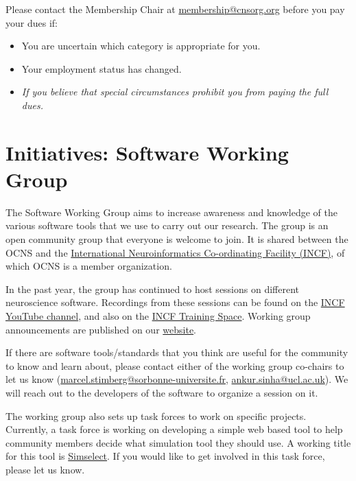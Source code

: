 \documentclass[11pt,a4paper,oneside]{article}
\begin{document}
Please contact the Membership Chair at \href{mailto:membership@cnsorg.org}{membership@cnsorg.org} before you pay your dues if:
\begin{itemize}
  \item You are uncertain which category is appropriate for you.
  \item Your employment status has changed.
\item \emph{If you believe that special circumstances prohibit you from paying the full dues.}
\end{itemize}


\clearpage
\section*{Initiatives: Software Working Group}%

The Software Working Group aims to increase awareness and knowledge of the various software tools that we use to carry out our research.
The group is an open community group that everyone is welcome to join.
It is shared between the OCNS and the \href{https://incf.org}{International Neuroinformatics Co-ordinating Facility (INCF)}, of which OCNS is a member organization.

In the past year, the group has continued to host sessions on different neuroscience software.
Recordings from these sessions can be found on the \href{https://www.youtube.com/@IncfOrg_INCF/videos}{INCF YouTube channel}, and also on the \href{https://training.incf.org/course/incfocns-working-group-computational-neuroscience-software}{INCF Training Space}.
Working group announcements are published on our \href{https://ocns.github.io/SoftwareWG/}{website}.

If there are software tools/standards that you think are useful for the community to know and learn about, please contact either of the working group co-chairs to let us know (\href{mailto:marcel.stimberg@sorbonne-universite.fr}{marcel.stimberg@sorbonne-universite.fr}, \href{mailto:ankur.sinha@ucl.ac.uk}{ankur.sinha@ucl.ac.uk}).
We will reach out to the developers of the software to organize a session on it.

The working group also sets up task forces to work on specific projects.
Currently, a task force is working on developing a simple web based tool to help community members decide what simulation tool they should use.
A working title for this tool is \href{https://github.com/OCNS/simselect/issues}{Simselect}. 
If you would like to get involved in this task force, please let us know.
\end{document}
